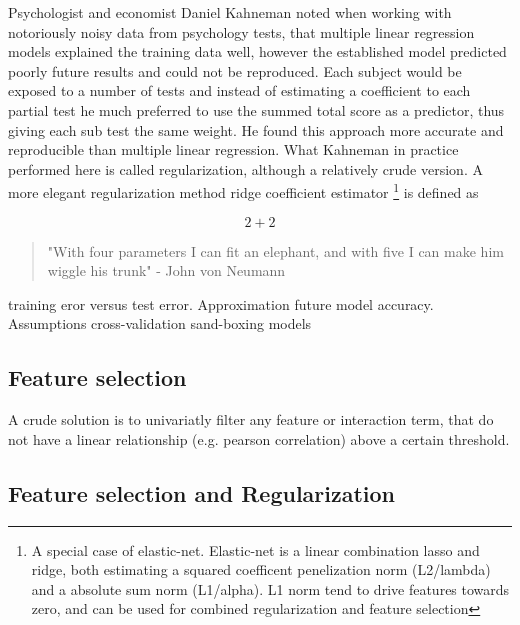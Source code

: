Psychologist and economist Daniel Kahneman noted when working with notoriously noisy data from psychology tests, that multiple linear regression models explained the training data well, however the established model predicted poorly future results and could not be reproduced. Each subject would be exposed to a number of tests and instead of estimating a coefficient to each partial test he much preferred to use the summed total score as a predictor, thus giving each sub test the same weight. He found this approach more accurate and reproducible than multiple linear regression\cite{kahneman2011thinking}. What Kahneman in practice performed here is called regularization, although a relatively crude version. A more elegant regularization method ridge coefficient estimator \footnote{A special case of elastic-net. Elastic-net is a linear combination lasso and ridge, both estimating a squared coefficent penelization norm (L2/lambda) and a absolute sum norm (L1/alpha). L1 norm tend to drive features towards zero, and can be used for combined regularization and feature selection} is defined as 

\begin{equation}
2+2


\end{equation}



\begin{quote}
"With four parameters I can fit an elephant, and with five I can make him wiggle his trunk"  - John von Neumann
\cite{wiki2016John}
\end{quote}


training eror versus test error. Approximation future model accuracy.
Assumptions cross-validation
sand-boxing models




\subsection{Feature selection}
A crude solution is to univariatly filter any feature or interaction term, that do not have a linear relationship (e.g. pearson correlation) above a certain threshold.



\subsection{Feature selection and Regularization}


